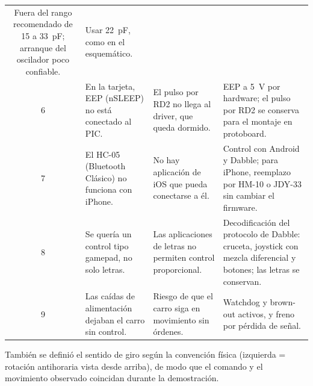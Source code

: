 \begin{table}[H]
\begin{tabularx}{\textwidth}{@{}c L L L@{}}
        Fuera del rango recomendado de 15 a \SI{33}{\pico\farad}; arranque del oscilador poco confiable. &
        Usar \SI{22}{\pico\farad}, como en el esquemático. \\
    6 & En la tarjeta, EEP (nSLEEP) no está conectado al PIC. &
        El pulso por RD2 no llega al driver, que queda dormido. &
        EEP a \SI{5}{\volt} por hardware; el pulso por RD2 se conserva para el montaje en protoboard. \\
    7 & El HC-05 (Bluetooth Clásico) no funciona con iPhone. &
        No hay aplicación de iOS que pueda conectarse a él. &
        Control con Android y Dabble; para iPhone, reemplazo por HM-10 o JDY-33 sin cambiar el firmware. \\
    8 & Se quería un control tipo gamepad, no solo letras. &
        Las aplicaciones de letras no permiten control proporcional. &
        Decodificación del protocolo de Dabble: cruceta, joystick con mezcla diferencial y botones; las letras se conservan. \\
    9 & Las caídas de alimentación dejaban el carro sin control. &
        Riesgo de que el carro siga en movimiento sin órdenes. &
        Watchdog y brown-out activos, y freno por pérdida de señal. \\
    \bottomrule
  \end{tabularx}
\end{table}

También se definió el sentido de giro según la convención física (izquierda =
rotación antihoraria vista desde arriba), de modo que el comando y el
movimiento observado coincidan durante la demostración.
